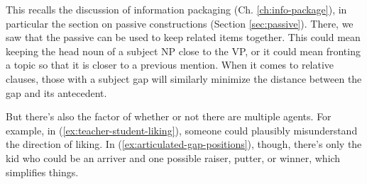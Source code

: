 \ea \label{ex:relatives-visualized}
    \z
\z


\ea \label{ex:teacher-student-liking}
    \z
\z

This recalls the discussion of information packaging (Ch. \ref{ch:info-package}), in particular the section on passive constructions (Section \ref{sec:passive}). There, we saw that the passive can be used to keep related items together. This could mean keeping the head noun of a subject NP close to the VP, or it could mean fronting a topic so that it is closer to a previous mention. When it comes to relative clauses, those with a subject gap will similarly minimize the distance between the gap and its antecedent.

But there's also the factor of whether or not there are multiple agents. For example, in (\ref{ex:teacher-student-liking}), someone could plausibly misunderstand the direction of liking. In (\ref{ex:articulated-gap-positions}), though, there's only the kid who could be an arriver and one possible raiser, putter, or winner, which simplifies things.

